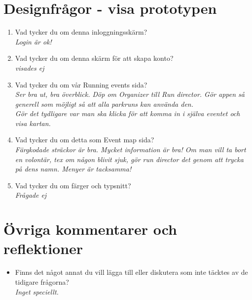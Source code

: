 \documentclass{article}
\begin{document}
\section*{Designfrågor - visa prototypen}
\begin{enumerate}[label=\textbf{Fråga \arabic*:}]
    \item Vad tycker du om denna inloggningsskärm?\\
        \textit{Login är ok!}
    \item Vad tycker du om denna skärm för att skapa konto?\\
        \textit{visades ej}
    \item Vad tycker du om vår Running events sida?\\
        \textit{Ser bra ut, bra överblick. Döp om Organizer till Run director. Gör appen så generell som möjligt så att alla parkruns kan använda den.
        \\ Gör det tydligare var man ska klicka för att komma in i själva eventet och visa kartan.}
    \item Vad tycker du om detta som Event map sida?\\
        \textit{Färgkodade sträckor är bra. Mycket information är bra! Om man vill ta bort en volontär, tex om någon blivit sjuk, gör run director det genom att trycka på dens namn. Menyer är tacksamma!}
    \item Vad tycker du om färger och typsnitt?\\
        \textit{Frågade ej}
\end{enumerate}

\section*{Övriga kommentarer och reflektioner}
\begin{itemize}[label=]
    \item Finns det något annat du vill lägga till eller diskutera som inte täcktes av de tidigare frågorna?\\
    \textit{Inget speciellt.}
\end{itemize}
\thispagestyle{empty}
\end{document}
